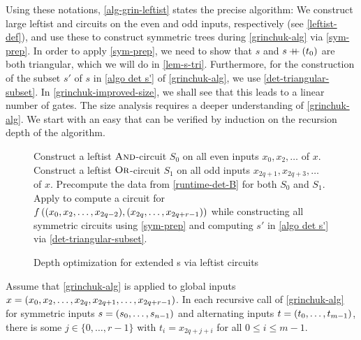 Using these notations, \cref{alg-grin-leftist} states the precise algorithm:
We construct large leftist \AND{} and \OR{} circuits on the even and odd inputs, respectively (see \cref{leftist-def}),
and use these to construct symmetric trees during \cref{grinchuk-alg} via \cref{sym-prep}.
In order to apply \cref{sym-prep}, we need to show that  $s$ and $s \mathbin{+\mkern-8mu+} (t_0)$ are both triangular,
which we will do in \cref{lem-s-tri}.
Furthermore, for the construction of the subset $s'$ of $s$
in \cref{algo det s'} of \cref{grinchuk-alg},
we use \cref{det-triangular-subset}.
In \cref{grinchuk-improved-size}, we shall see that this leads to a linear number of gates.
The size analysis requires a deeper understanding of \cref{grinchuk-alg}.
We start with an easy  that can be
verified by induction on the recursion depth of the algorithm.

\begin{figure}
 \begin{algorithm}[H]
 \caption{Depth optimization for extended \aop{}s via leftist circuits}
 \label{alg-grin-leftist}
   \DontPrintSemicolon
    \BlankLine
     Construct a leftist $\textsc{And}$-circuit $S\!_0$ on all even inputs $x_0, x_2, \dotsc$ of $x$.\; \label{leftist-and}
     Construct a leftist $\textsc{Or}$-circuit $S\!_1$ on all odd inputs $x_{2q + 1}, x_{2q + 3}, \dotsc$ of $x$.\; \label{leftist-or}
     Precompute the data from \cref{runtime-det-B} for both $S\!_0$ and $S\!_1$.\; \label{leftist-data}
     Apply  to compute a circuit for $f\left({(x_0, x_2, \dotsc, x_{2q-2}), (x_{2q}, \dotsc, x_{2q + r - 1})}\right)$
     while constructing all symmetric circuits using \cref{sym-prep}
     and computing $s'$ in \cref{algo det s'} via \cref{det-triangular-subset}.\;
 \end{algorithm}
 \end{figure}

\begin{observation}\label{obs-t-consecutive}
 Assume that \cref{grinchuk-alg} is applied to global inputs $x = ({x_0, x_2, \dotsc, x_{2q}, x_{2q+1}, \dotsc, x_{2q + r - 1}})$.
 In each recursive call of \cref{grinchuk-alg} for
 symmetric inputs $s = \left({s_0, \dotsc, s_{n-1}}\right)$ and alternating inputs $t = \left({t_0, \dotsc, t_{m-1}}\right)$,
 there is some $j \in \{ 0, \dotsc, r - 1\}$ with $t_i = x_{2q + j + i}$ for all $0 \leq i \leq m -1$.
\end{observation}

